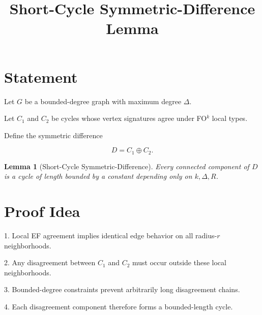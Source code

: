 \documentclass[11pt]{article}
\title{Short-Cycle Symmetric-Difference Lemma}
\date{}
\newtheorem{lemma}{Lemma}
\begin{document}
\maketitle

\section*{Statement}

Let $G$ be a bounded-degree graph with maximum degree $\Delta$.

Let $C_1$ and $C_2$ be cycles whose vertex signatures agree under
FO$^k$ local types.

Define the symmetric difference

\[
D = C_1 \oplus C_2 .
\]

\begin{lemma}[Short-Cycle Symmetric-Difference]

Every connected component of $D$ is a cycle of length bounded by a
constant depending only on $k,\Delta,R$.

\end{lemma}

\section*{Proof Idea}

1. Local EF agreement implies identical edge behavior on all
   radius-$r$ neighborhoods.

2. Any disagreement between $C_1$ and $C_2$ must occur outside
   these local neighborhoods.

3. Bounded-degree constraints prevent arbitrarily long
   disagreement chains.

4. Each disagreement component therefore forms a bounded-length cycle.
\end{document}
